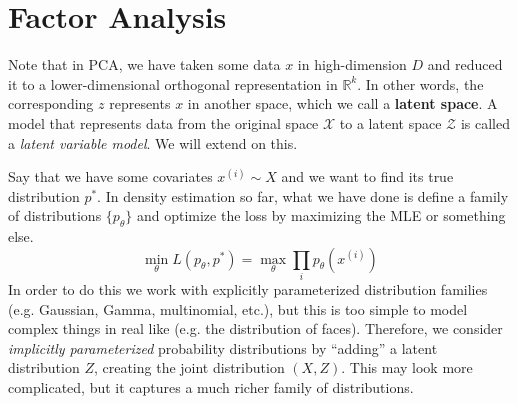 \section{Factor Analysis}

  Note that in PCA, we have taken some data $x$ in high-dimension $D$ and reduced it to a lower-dimensional orthogonal representation in $\mathbb{R}^k$. In other words, the corresponding $z$ represents $x$ in another space, which we call a \textbf{latent space}. A model that represents data from the original space $\mathcal{X}$ to a latent space $\mathcal{Z}$ is called a \textit{latent variable model}. We will extend on this. 

  Say that we have some covariates $x^{(i)} \sim X$ and we want to find its true distribution $p^\ast$. In density estimation so far, what we have done is define a family of distributions $\{p_\theta\}$ and optimize the loss by maximizing the MLE or something else. 
  \begin{equation}
    \min_\theta L(p_\theta, p^\ast) = \max_\theta \prod_{i} p_\theta(x^{(i)})
  \end{equation}
  In order to do this we work with explicitly parameterized distribution families (e.g. Gaussian, Gamma, multinomial, etc.), but this is too simple to model complex things in real like (e.g. the distribution of faces). Therefore, we consider \textit{implicitly parameterized} probability distributions by ``adding'' a latent distribution $Z$, creating the joint distribution $(X, Z)$. This may look more complicated, but it captures a much richer family of distributions. 

